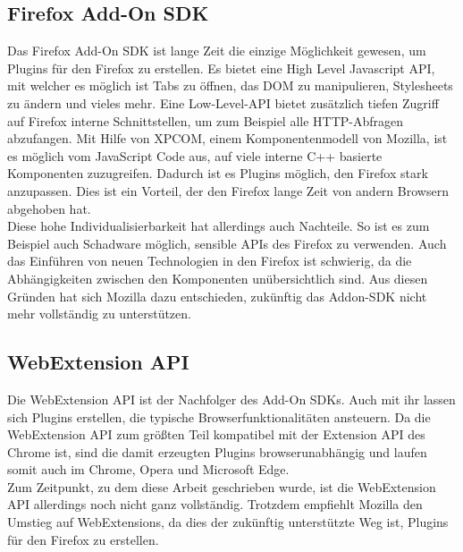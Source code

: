 \subsection{Firefox Add-On SDK}
Das Firefox Add-On SDK ist lange Zeit die einzige Möglichkeit gewesen, um Plugins für den Firefox zu erstellen. Es bietet eine High Level Javascript API, mit welcher es möglich ist Tabs zu öffnen, das DOM zu manipulieren, Stylesheets zu ändern und vieles mehr. Eine Low-Level-API bietet zusätzlich tiefen Zugriff auf Firefox interne Schnittstellen, um zum Beispiel alle HTTP-Abfragen abzufangen. Mit Hilfe von XPCOM, einem Komponentenmodell von Mozilla, ist es möglich vom JavaScript Code aus, auf viele interne C++ basierte Komponenten zuzugreifen. Dadurch ist es Plugins möglich, den Firefox stark anzupassen. Dies ist ein Vorteil, der den Firefox lange Zeit von andern Browsern abgehoben hat. \\
Diese hohe Individualisierbarkeit hat allerdings auch Nachteile. So ist es zum Beispiel auch Schadware möglich, sensible APIs des Firefox zu verwenden. Auch das Einführen von neuen Technologien in den Firefox ist schwierig, da die Abhängigkeiten zwischen den Komponenten unübersichtlich sind. Aus diesen Gründen hat sich Mozilla dazu entschieden, zukünftig das Addon-SDK nicht mehr vollständig zu unterstützen. \cite{FirefoxAddonFuture}
\subsection{WebExtension API}
Die WebExtension API ist der Nachfolger des Add-On SDKs. Auch mit ihr lassen sich Plugins erstellen, die typische Browserfunktionalitäten ansteuern. Da die WebExtension API zum größten Teil kompatibel mit der Extension API des Chrome ist, sind die damit erzeugten Plugins browser\-unabhängig und laufen somit auch im Chrome, Opera und Microsoft Edge. \\
Zum Zeitpunkt, zu dem diese Arbeit geschrieben wurde, ist die WebExtension API allerdings noch nicht ganz vollständig. Trotzdem empfiehlt Mozilla den Umstieg auf WebExtensions, da dies der zukünftig unterstützte Weg ist, Plugins für den Firefox zu erstellen.
